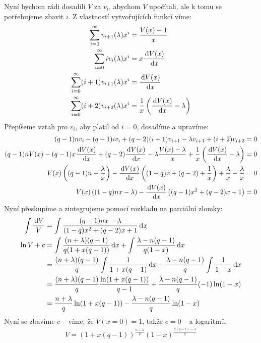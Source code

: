 Nyní bychom rádi dosadili $V$ za $v_i$, abychom $V$ upočítali, ale k tomu
se potřebujeme zbavit $i$. Z vlastností vytvořujících funkcí víme:
\begin{align}
  \sum_{i=0}^\infty v_{i+1}(\lambda) x^i &= \frac{V(x) - 1}{x} \\
  \sum_{i=0}^\infty i v_i(\lambda) x^i     &= x \frac{\,\textrm{d} V(x)}{\,\textrm{d} x} \\
  \sum_{i=0}^\infty (i+1) v_{i+1}(\lambda) x^i &= \frac{\,\textrm{d} V(x)}{\,\textrm{d} x} \\
  \sum_{i=0}^\infty (i+2) v_{i+2}(\lambda) x^i &=
    \frac{1}{x}\left( \frac{\,\textrm{d} V(x)}{\,\textrm{d} x} - \lambda \right)
\end{align}
Přepíšeme vztah pro $v_i$, aby platil od $i = 0$, dosadíme a upravíme:
\begin{align}
  (q - 1)n v_i - (q - 1) i v_i + (q-2)(i+1)v_{i+1}
    - \lambda v_{i+1} +(i+2)v_{i+2} &= 0 \\
  (q - 1)n V(x) - (q - 1)x \frac{\,\textrm{d} V(x)}{\,\textrm{d} x}
    + (q-2)\frac{\,\textrm{d} V(x)}{\,\textrm{d} x} - \lambda \frac{V(x) - \lambda}{x}
    + \frac{1}{x}\left(\frac{\,\textrm{d} V(x)}{\,\textrm{d} x} - \lambda \right) &= 0 \\
  V(x) \left( (q - 1)n - \frac{\lambda}{x} \right) -
    \frac{\,\textrm{d} V(x)}{\,\textrm{d} x} \left( (1 - q)x + (q-2) + \frac{1}{x} \right)
    + \frac{\lambda}{x} - \frac{\lambda}{x} &= 0 \\
  V(x)\left( (1 - q)nx - \lambda \right) - \frac{\,\textrm{d} V(x)}{\,\textrm{d} x} \left(
    (q - 1)x^2 + (q-2)x + 1
    \right) &= 0
\end{align}
Nyní přeskupíme a zintegrujeme pomocí rozkladu na parciální zlomky:
\begin{align}
  \int \frac{\,\textrm{d} V}{V} &=
    \int \frac{(q - 1)nx - \lambda}{(1 - q)x^2 + (q-2)x + 1} \,\textrm{d} x \\
  \ln V + c &= \int \frac{(n+\lambda)(q-1)}{q(1 + x(q-1))} \,\textrm{d} x +
               \int \frac{\lambda - n(q - 1)}{q(1 - x)} \,\textrm{d} x \\
   &= \frac{(n+\lambda)(q-1)}{q} \int \frac{1}{1 + x(q-1)} \,\textrm{d} x +
               \frac{\lambda - n(q - 1)}{q} \int \frac{1}{1 - x} \,\textrm{d} x \\
   &= \frac{(n+\lambda)(q-1)}{q} \frac{\ln (1 + x(q-1))}{q-1} +
               \frac{\lambda - n(q - 1)}{q} (-1) \ln (1 - x) \\
   &= \frac{n+\lambda}{q} \ln (1 + x(q-1)) -
               \frac{\lambda - n(q - 1)}{q} \ln (1 - x)
\end{align}
Nyní se zbavíme $c$ -- víme, že $V(x = 0) = 1$, takže $c = 0$ -- a logaritmů.
\begin{align}
  V = (1 + x(q-1))^{\frac{n + \lambda}{q}} (1 - x)^{\frac{n(q-1) - \lambda}{q}}
\end{align}
